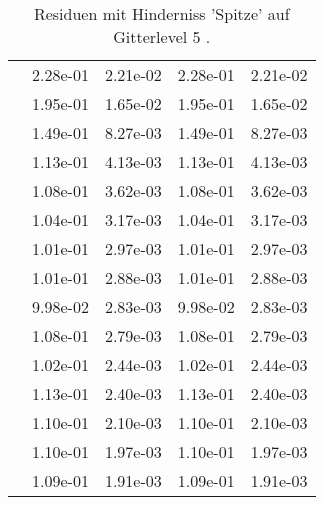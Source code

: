 \begin{table}
\begin{tabular}{c|cc|cc|}
\multicolumn{1}{|c|}{} & \multicolumn{1}{|c|}{  2.28e-01} & \multicolumn{1}{|c|}{  2.21e-02} & \multicolumn{1}{|c|}{  2.28e-01} & \multicolumn{1}{|c|}{  2.21e-02} \\ 
\multicolumn{1}{|c|}{} & \multicolumn{1}{|c|}{  1.95e-01} & \multicolumn{1}{|c|}{  1.65e-02} & \multicolumn{1}{|c|}{  1.95e-01} & \multicolumn{1}{|c|}{  1.65e-02} \\ 
\multicolumn{1}{|c|}{} & \multicolumn{1}{|c|}{  1.49e-01} & \multicolumn{1}{|c|}{  8.27e-03} & \multicolumn{1}{|c|}{  1.49e-01} & \multicolumn{1}{|c|}{  8.27e-03} \\ 
\multicolumn{1}{|c|}{} & \multicolumn{1}{|c|}{  1.13e-01} & \multicolumn{1}{|c|}{  4.13e-03} & \multicolumn{1}{|c|}{  1.13e-01} & \multicolumn{1}{|c|}{  4.13e-03} \\ 
\multicolumn{1}{|c|}{} & \multicolumn{1}{|c|}{  1.08e-01} & \multicolumn{1}{|c|}{  3.62e-03} & \multicolumn{1}{|c|}{  1.08e-01} & \multicolumn{1}{|c|}{  3.62e-03} \\ 
\multicolumn{1}{|c|}{} & \multicolumn{1}{|c|}{  1.04e-01} & \multicolumn{1}{|c|}{  3.17e-03} & \multicolumn{1}{|c|}{  1.04e-01} & \multicolumn{1}{|c|}{  3.17e-03} \\ 
\multicolumn{1}{|c|}{} & \multicolumn{1}{|c|}{  1.01e-01} & \multicolumn{1}{|c|}{  2.97e-03} & \multicolumn{1}{|c|}{  1.01e-01} & \multicolumn{1}{|c|}{  2.97e-03} \\ 
\multicolumn{1}{|c|}{} & \multicolumn{1}{|c|}{  1.01e-01} & \multicolumn{1}{|c|}{  2.88e-03} & \multicolumn{1}{|c|}{  1.01e-01} & \multicolumn{1}{|c|}{  2.88e-03} \\ 
\multicolumn{1}{|c|}{} & \multicolumn{1}{|c|}{  9.98e-02} & \multicolumn{1}{|c|}{  2.83e-03} & \multicolumn{1}{|c|}{  9.98e-02} & \multicolumn{1}{|c|}{  2.83e-03} \\ 
\multicolumn{1}{|c|}{} & \multicolumn{1}{|c|}{  1.08e-01} & \multicolumn{1}{|c|}{  2.79e-03} & \multicolumn{1}{|c|}{  1.08e-01} & \multicolumn{1}{|c|}{  2.79e-03} \\ 
\multicolumn{1}{|c|}{} & \multicolumn{1}{|c|}{  1.02e-01} & \multicolumn{1}{|c|}{  2.44e-03} & \multicolumn{1}{|c|}{  1.02e-01} & \multicolumn{1}{|c|}{  2.44e-03} \\ 
\multicolumn{1}{|c|}{} & \multicolumn{1}{|c|}{  1.13e-01} & \multicolumn{1}{|c|}{  2.40e-03} & \multicolumn{1}{|c|}{  1.13e-01} & \multicolumn{1}{|c|}{  2.40e-03} \\ 
\multicolumn{1}{|c|}{} & \multicolumn{1}{|c|}{  1.10e-01} & \multicolumn{1}{|c|}{  2.10e-03} & \multicolumn{1}{|c|}{  1.10e-01} & \multicolumn{1}{|c|}{  2.10e-03} \\ 
\multicolumn{1}{|c|}{} & \multicolumn{1}{|c|}{  1.10e-01} & \multicolumn{1}{|c|}{  1.97e-03} & \multicolumn{1}{|c|}{  1.10e-01} & \multicolumn{1}{|c|}{  1.97e-03} \\ 
\multicolumn{1}{|c|}{} & \multicolumn{1}{|c|}{  1.09e-01} & \multicolumn{1}{|c|}{  1.91e-03} & \multicolumn{1}{|c|}{  1.09e-01} & \multicolumn{1}{|c|}{  1.91e-03} \\ 
\hline 
\end{tabular}\caption{Residuen mit Hinderniss 'Spitze' auf Gitterlevel 5 .}\label{tab:Residuum_Spitze_level5}
\end{table} 
